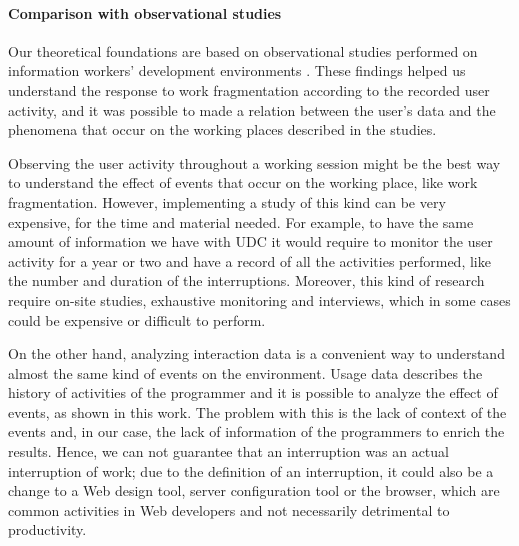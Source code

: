 \documentclass[times]{smrauth}
\begin{document}

\paragraph{Comparison with observational studies}
Our theoretical foundations are based on observational studies performed on information workers' development environments \cite{MGH05, IH07, LVD06, PD10}. These findings helped us understand the response to work fragmentation according to the recorded user activity, and it was possible to made a relation between the user's data and the phenomena that occur on the working places described in the studies.

Observing the user activity throughout a working session might be the best way to understand the effect of events that occur on the working place, like work fragmentation. However, implementing a study of this kind can be very expensive, for the time and material needed. For example, to have the same amount of information we have with UDC it would require to monitor the user activity for a year or two and have a record of all the activities performed, like the number and duration of the interruptions. Moreover, this kind of research require on-site studies, exhaustive monitoring and interviews, which in some cases could be expensive or difficult to perform.

On the other hand, analyzing interaction data is a convenient way to understand almost the same kind of events on the environment. Usage data describes the history of activities of the programmer and it is possible to analyze the effect of events, as shown in this work. The problem with this is the lack of context of the events and, in our case, the lack of information of the programmers to enrich the results. Hence, we can not guarantee that an interruption was an actual interruption of work; due to the definition of an interruption, it could also be a change to a Web design tool, server configuration tool or the browser, which are common activities in Web developers and not necessarily detrimental to productivity.
\end{document}

